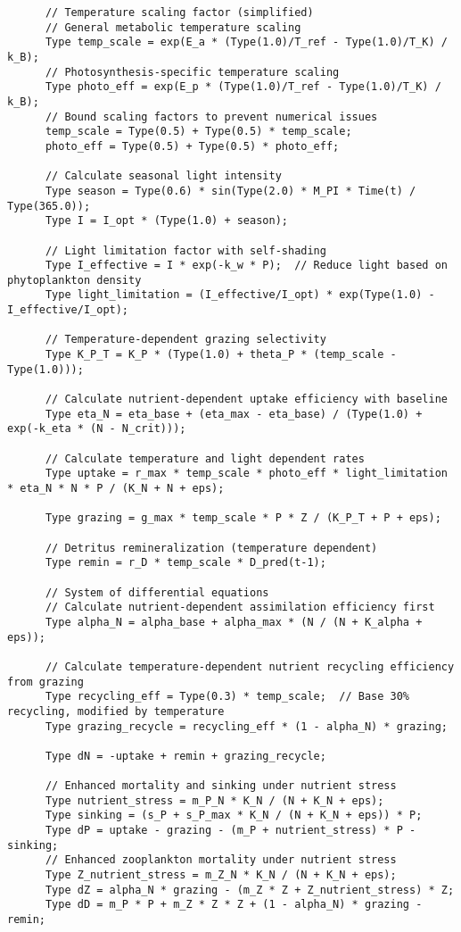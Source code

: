 \begin{lstlisting}
      // Temperature scaling factor (simplified)
      // General metabolic temperature scaling
      Type temp_scale = exp(E_a * (Type(1.0)/T_ref - Type(1.0)/T_K) / k_B);
      // Photosynthesis-specific temperature scaling
      Type photo_eff = exp(E_p * (Type(1.0)/T_ref - Type(1.0)/T_K) / k_B);
      // Bound scaling factors to prevent numerical issues
      temp_scale = Type(0.5) + Type(0.5) * temp_scale;
      photo_eff = Type(0.5) + Type(0.5) * photo_eff;
      
      // Calculate seasonal light intensity 
      Type season = Type(0.6) * sin(Type(2.0) * M_PI * Time(t) / Type(365.0));
      Type I = I_opt * (Type(1.0) + season);
      
      // Light limitation factor with self-shading
      Type I_effective = I * exp(-k_w * P);  // Reduce light based on phytoplankton density
      Type light_limitation = (I_effective/I_opt) * exp(Type(1.0) - I_effective/I_opt);
      
      // Temperature-dependent grazing selectivity
      Type K_P_T = K_P * (Type(1.0) + theta_P * (temp_scale - Type(1.0)));
      
      // Calculate nutrient-dependent uptake efficiency with baseline
      Type eta_N = eta_base + (eta_max - eta_base) / (Type(1.0) + exp(-k_eta * (N - N_crit)));
      
      // Calculate temperature and light dependent rates
      Type uptake = r_max * temp_scale * photo_eff * light_limitation * eta_N * N * P / (K_N + N + eps);
      
      Type grazing = g_max * temp_scale * P * Z / (K_P_T + P + eps);
      
      // Detritus remineralization (temperature dependent)
      Type remin = r_D * temp_scale * D_pred(t-1);
      
      // System of differential equations
      // Calculate nutrient-dependent assimilation efficiency first
      Type alpha_N = alpha_base + alpha_max * (N / (N + K_alpha + eps));
      
      // Calculate temperature-dependent nutrient recycling efficiency from grazing
      Type recycling_eff = Type(0.3) * temp_scale;  // Base 30% recycling, modified by temperature
      Type grazing_recycle = recycling_eff * (1 - alpha_N) * grazing;
      
      Type dN = -uptake + remin + grazing_recycle;
      
      // Enhanced mortality and sinking under nutrient stress
      Type nutrient_stress = m_P_N * K_N / (N + K_N + eps);
      Type sinking = (s_P + s_P_max * K_N / (N + K_N + eps)) * P;
      Type dP = uptake - grazing - (m_P + nutrient_stress) * P - sinking;
      // Enhanced zooplankton mortality under nutrient stress
      Type Z_nutrient_stress = m_Z_N * K_N / (N + K_N + eps);
      Type dZ = alpha_N * grazing - (m_Z * Z + Z_nutrient_stress) * Z;
      Type dD = m_P * P + m_Z * Z * Z + (1 - alpha_N) * grazing - remin;
      

\end{lstlisting}
